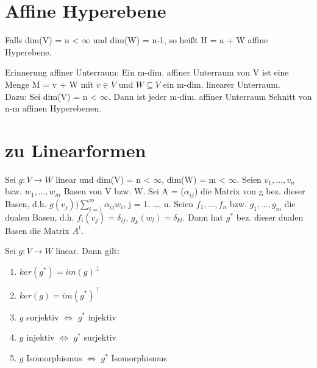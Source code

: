 \section{Affine Hyperebene}
\begin{definition}
Falls dim(V) = n < $\infty$ und dim(W) = n-1, so heißt H = a + W affine Hyperebene.
\end{definition}

\begin{remark}
Erinnerung affiner Unterraum: Ein m-dim. affiner Unterraum von V ist eine Menge M = v + W mit  $v \in V$ und $W \subseteq V$ ein m-dim. linearer Unterraum.\\
Dazu: Sei dim(V) = n < $\infty$. Dann ist jeder m-dim. affiner Unterraum Schnitt von n-m affinen Hyperebenen.
\end{remark}

\section{zu Linearformen}
\begin{lemma}
Sei $g: V \to W$ linear und dim(V) = n < $\infty$, dim(W) = m < $\infty$. Seien $v_1, …, v_n$ bzw. $w_1, …, w_m$ Basen von V bzw. W. Sei A = ($\alpha_{ij}$) die Matrix von g bez. dieser Basen, d.h. $g(v_j) ) \sum\limits_{i=1}^m \alpha_{ij} w_i$, j = 1, …, n. Seien $f_1, …, f_n$ bzw. $g_1, …, g_m$ die dualen Basen, d.h. $f_i(v_j) = \delta_{ij}$, $g_k(w_l) = \delta_{kl}$. Dann hat $g^*$ bez. dieser dualen Basen die Matrix $A^t$.
\end{lemma}

\begin{proposition}
Sei $g: V \to W$ linear. Dann gilt:
\begin{enumerate}
\item $ker(g^*) = im(g)^\perp$
\item $ker(g) = im(g^*)^\top$
\item $g$ surjektiv $\Leftrightarrow$ $g^*$ injektiv
\item $g$ injektiv $\Leftrightarrow$ $g^*$ surjektiv
\item $g$ Isomorphismus $\Leftrightarrow$ $g^*$ Isomorphismus
\end{enumerate}
\end{proposition}

